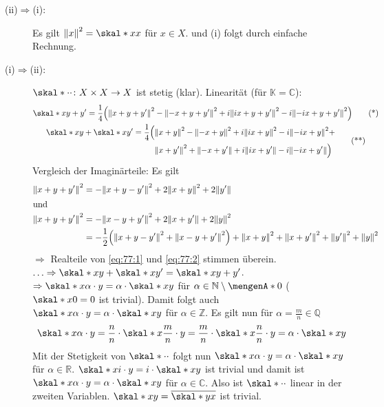\begin{description}
	\item[(ii)$\Rightarrow$(i):] Es gilt $\norm{x}^2 = \skal*{x}{x}$ für $x \in X$. und (i) folgt durch einfache Rechnung.
	\item[(i)$\Rightarrow$(ii):] $\skal*{\cdot}{\cdot} \colon X \times X \to X$ ist stetig (klar). Linearität (für $\mathds{K}=\mathds{C}$):
	\begin{gather*}
		\skal*{x}{y+y'} = \frac{1}{4} \enbrace*{\norm{x+y+y'}^2 - \norm{-x+y+y'}^2 + i  \norm{i x + y+ y'}^2 - i \norm{- ix +y+y'}^2} \label{eq:77:1}\tag{*} \\ 
		\begin{split}
			\skal*{x}{y} + \skal*{x}{y'} = \frac{1}{4} \Big( &\norm{x+y}^2 - \norm{-x+y}^2 + i  \norm{ix +y}^2 - i  \norm{-ix +y}^2 + \\
			&\norm{x+y'}^2 + \norm{-x+y'} + i  \norm{ix + y'} - i  \norm{-ix +y'} \Big)
		\end{split}
		\label{eq:77:2}\tag{**}
	\end{gather*}
	Vergleich der Imaginärteile: Es gilt
	\begin{align*}
		\norm{x+y+y'}^2 &= - \norm{x+y-y'}^2 + 2 \norm{x+y}^2 + 2 \norm{y'}  \\
		\shortintertext{und}
		\norm{x+y+y'}^2 &= - \norm{x-y+y'}^2 + 2 \norm{x+y'} + 2 \norm{y}^2 \\
		&= - \frac{1}{2} \enbrace*{\norm{x+y-y'}^2 + \norm{x-y+y'}^2} + \norm{x+y}^2 + \norm{x+y'}^2 + \norm{y'}^2 + \norm{y}^2         
	\end{align*}
	$\Rightarrow$ Realteile von \eqref{eq:77:1} und \eqref{eq:77:2} stimmen überein. $\ldots \Rightarrow \skal*{x}{y} + \skal*{x}{y'}= \skal*{x}{y+y'}$.
	$\Rightarrow \skal*{x}{\alpha \cdot y} = \alpha \cdot \skal*{x}{y}$ für $\alpha \in \mathds{N} \setminus \set{0}$ ($\skal*{x}{0}=0$ ist trivial). Damit folgt auch
	$\skal*{x}{\alpha \cdot y} = \alpha \cdot \skal*{x}{y}$ für $\alpha \in \mathds{Z}$. Es gilt nun für $\alpha=\frac{m}{n} \in \mathds{Q}$
	\[
		\skal*{x}{\alpha \cdot y} = \frac{n}{n} \cdot \skal*{x}{\frac{m}{n} \cdot y } = \frac{m}{n} \cdot \skal*{x}{\frac{n}{n}\cdot y } = \alpha \cdot \skal*{x}{y}  
	\]
	Mit der Stetigkeit von $\skal*{\cdot}{\cdot}$ folgt nun $\skal*{x}{\alpha \cdot y} = \alpha \cdot \skal*{x}{y}$ für $\alpha \in \mathds{R}$.
	$\skal*{x}{i \cdot y} = i \cdot \skal*{x}{y}$ ist trivial und damit ist $\skal*{x}{\alpha \cdot y }= \alpha \cdot \skal*{x}{y}$ für $\alpha \in \mathds{C}$. Also ist
	$\skal*{\cdot}{\cdot}$ linear in der zweiten Variablen. $\skal*{x}{y} = \overline{\skal*{y}{x}}$ ist trivial. \bewende
\end{description}

